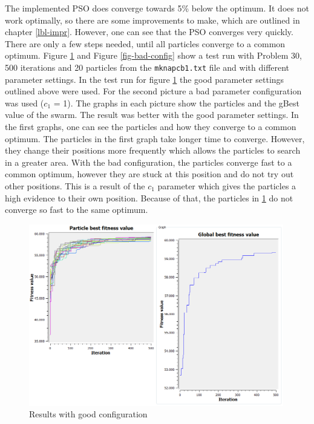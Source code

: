 \documentclass{article}
\begin{document}
The implemented PSO does converge towards 5\% below the optimum. It does not work optimally, so there are some improvements to make, which are outlined in chapter \ref{lbl-impr}. However, one can see that the PSO converges very quickly. There are only a few steps needed, until all particles converge to a common optimum. Figure \ref{fig-good-config} and Figure \ref{fig-bad-config} show a test run with Problem 30, 500 iterations and 20 particles from the \lstinline{mknapcb1.txt} file and with different parameter settings. In the test run for figure \ref{fig-good-config} the good parameter settings outlined above were used. For the second picture a bad parameter configuration was used ($c_1$ = 1). The graphs in each picture show the particles and the gBest value of the swarm. The result was better with the good parameter settings. In the first graphs, one can see the particles and how they converge to a common optimum. The particles in the first graph take longer time to converge. However, they change their positions more frequently which allows the particles to search in a greater area. With the bad configuration, the particles converge fast to a common optimum, however they are stuck at this position and do not try out other positions. This is a result of the $c_1$ parameter which gives the particles a high evidence to their own position. Because of that, the particles in \ref{fig-good-config} do not converge so fast to the same optimum.

\begin{figure}[H]
    \centering
    \includegraphics[width=420px]{images/p20_500it_p30_both.png}
    \caption{Results with good configuration}
    \label{fig-good-config}
\end{figure}
\end{document}
